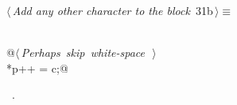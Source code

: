\documentclass[a4paper]{report}
\begin{document}
\begin{flushleft} \small
\begin{minipage}{\linewidth}\label{scrap53}\raggedright\small
{} $\langle\,${\it Add any other character to the block}\nobreak\ {\footnotesize {31b}}$\,\rangle\equiv$
\vspace{-1ex}
\begin{list}{}{} \item
\mbox{}\verb@@\\
\mbox{}\verb@   @\hbox{$\langle\,${\it Perhaps skip white-space}\nobreak\ {\footnotesize {}}$\,\rangle$}\verb@@\\
\mbox{}\verb@   *p++ = c;@\\
\mbox{}\verb@@{\NWsep}
\end{list}
\vspace{-1.5ex}
\footnotesize
\begin{list}{}{\setlength{\itemsep}{-\parsep}\setlength{\itemindent}{-\leftmargin}}
\item \NWtxtMacroRefIn\ .

\item{}
\end{list}
\end{minipage}\vspace{4ex}
\end{flushleft}
\end{document}
